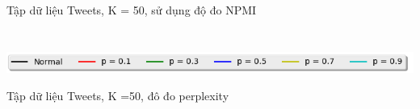 \documentclass[pdf]{beamer}
\begin{document}
\begin{frame}{Tập dữ liệu Tweets, K = 50, sử dụng độ đo NPMI }
\begin{columns}[T]
\begin{column}{.50\textwidth}
\begin{figure}
\end{figure}				
\end{column} %
\end{columns}
\begin{center}
\includegraphics[width=1\textwidth]{menu.png}	
\end{center}
\end{frame}


\begin{frame}{Tập dữ liệu Tweets, K =50, đô đo perplexity}
\begin{columns}[T] %
	\begin{column}{.50\textwidth}
		\begin{figure}
		\end{figure}
	\end{column} %
	\hfill%
	\begin{column}{.50\textwidth}
		\begin{figure}

\end{figure}
\end{column}
\end{columns}
\end{frame}
\end{document}
